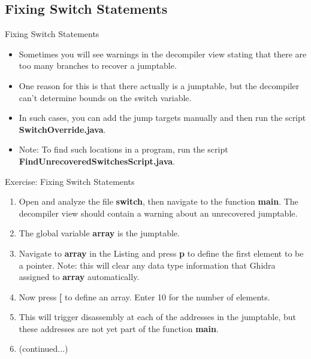 \documentclass{beamer}
\begin{document}
\subsection{Fixing Switch Statements}
\begin{frame}
\begin{block}{Fixing Switch Statements}
\begin{itemize}
\item Sometimes you will see warnings in the decompiler view stating that there are too many branches to recover a jumptable. 
\item One reason for this is that there actually is a jumptable, but the decompiler can't determine bounds on the switch variable.
\item In such cases, you can add the jump targets manually and then run the script \textbf{SwitchOverride.java}. 
\item Note: To find such locations in a program, run the script \textbf{FindUnrecoveredSwitchesScript.java}.
\end{itemize}
\end{block}
\end{frame}

\begin{frame}
\begin{block}{Exercise: Fixing Switch Statements}
\begin{enumerate}
\item Open and analyze the file \textbf{switch}, then navigate to the function \textbf{main}. The decompiler view should contain a warning about an unrecovered jumptable.
\item The global variable \textbf{array} is the jumptable. 
\item Navigate to \textbf{array} in the Listing and press \textbf{p} to define the first element to be a pointer.  Note: this will clear any data type information that Ghidra assigned to 
\textbf{array} automatically.
\item Now press \textbf{[} to define an array.  Enter 10 for the number of elements. 
\item This will trigger disassembly at each of the addresses in the jumptable, but these addresses are not yet part of the function \textbf{main}.
\item[] (continued...)
\end{enumerate}
\end{block}
\end{frame}
\end{document}
